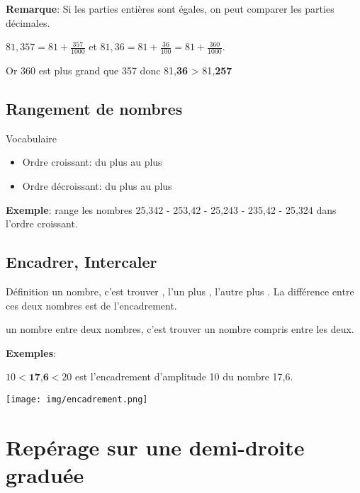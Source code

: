 \documentclass[12pt,a4paper]{article}
\begin{document}
\textbf{Remarque}: Si les parties entières  sont égales, on peut comparer les parties décimales.

$\displaystyle 81,357 = 81+\frac{357}{1000}$ et $\displaystyle 81,36 = 81+\frac{36}{100} = 81+\frac{360}{1000}$.

Or 360  est plus grand que 357  donc 81,\textbf{36} > 81,\textbf{257}
 
\subsection{Rangement de nombres}

\begin{definition}{Vocabulaire}
\begin{itemize}
\item Ordre croissant: du plus  au plus 
\item Ordre décroissant: du plus  au plus 
\end{itemize}
\end{definition}

\textbf{Exemple}: range les nombres 25,342 - 253,42 - 25,243 - 235,42 - 25,324 dans l'ordre croissant.


\subsection{Encadrer, Intercaler}

\begin{definition}{Définition}
 un nombre, c'est trouver , l'un plus , l'autre plus . La différence entre ces deux nombres est  de l'encadrement.

 un nombre entre deux nombres, c'est trouver un nombre compris entre les deux.
\end{definition}

\textbf{Exemples}:

$10 < \textbf{17,6} < 20$ est l'encadrement d'amplitude 10 du nombre 17,6.

\texttt{[image: img/encadrement.png]} 

\section{Repérage sur une demi-droite graduée}
\end{document}
